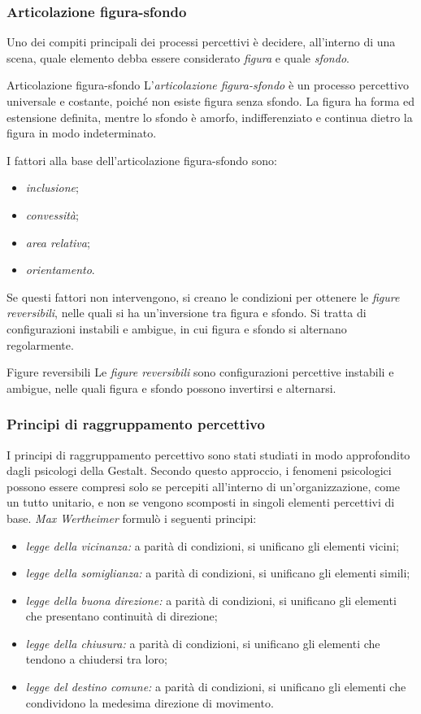 \documentclass[a4paper]{article}
\begin{document}
\subsubsection{Articolazione figura-sfondo}
Uno dei compiti principali dei processi percettivi è decidere, all'interno di una scena, quale elemento debba essere considerato \emph{figura} e quale \emph{sfondo}.
\begin{snippetdefinition}{Articolazione figura-sfondo}
    L'\emph{articolazione figura-sfondo} è un processo percettivo universale e costante, poiché non esiste figura senza sfondo. La figura ha forma ed estensione definita, mentre lo sfondo è amorfo, indifferenziato e continua dietro la figura in modo indeterminato.
\end{snippetdefinition}
I fattori alla base dell'articolazione figura-sfondo sono:
\begin{itemize}
    \item \emph{inclusione};
    \item \emph{convessità};
    \item \emph{area relativa};
    \item \emph{orientamento}.
\end{itemize}
Se questi fattori non intervengono, si creano le condizioni per ottenere le \emph{figure reversibili}, nelle quali si ha un'inversione tra figura e sfondo. Si tratta di configurazioni instabili e ambigue, in cui figura e sfondo si alternano regolarmente.
\begin{snippetdefinition}{Figure reversibili}
    Le \emph{figure reversibili} sono configurazioni percettive instabili e ambigue, nelle quali figura e sfondo possono invertirsi e alternarsi.
\end{snippetdefinition}
\subsubsection{Principi di raggruppamento percettivo}
I principi di raggruppamento percettivo sono stati studiati in modo approfondito dagli psicologi della Gestalt. Secondo questo approccio, i fenomeni psicologici possono essere compresi solo se percepiti all'interno di un'organizzazione, come un tutto unitario, e non se vengono scomposti in singoli elementi percettivi di base.
\emph{Max Wertheimer} formulò i seguenti principi:
\begin{itemize}
    \item \emph{legge della vicinanza:} a parità di condizioni, si unificano gli elementi vicini;
    \item \emph{legge della somiglianza:} a parità di condizioni, si unificano gli elementi simili;
    \item \emph{legge della buona direzione:} a parità di condizioni, si unificano gli elementi che presentano continuità di direzione;
    \item \emph{legge della chiusura:} a parità di condizioni, si unificano gli elementi che tendono a chiudersi tra loro;
    \item \emph{legge del destino comune:} a parità di condizioni, si unificano gli elementi che condividono la medesima direzione di movimento.
\end{itemize}
\end{document}
